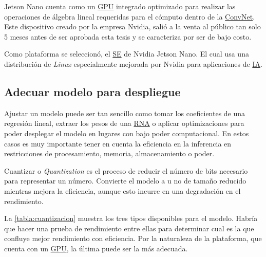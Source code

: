 Jetson Nano cuenta como un \hyperlink{abbr}{GPU} integrado optimizado para
    realizar las operaciones de álgebra lineal requeridas para el cómputo dentro
    de la \hyperlink{abbr}{ConvNet}. Este dispositivo creado por la empresa
    Nvidia, salió a la venta al público tan solo 5 meses antes de ser aprobada
    esta tesis y se caracteriza por ser de bajo costo.~\cite{Long2019}

Como plataforma se seleccionó, el \hyperlink{abbr}{SE} de Nvidia Jetson Nano. El
cual usa una distribución de \emph{Linux} especialmente mejorada por Nvidia para
aplicaciones de \hyperlink{abbr}{IA}. 

\subsection{Adecuar modelo para despliegue}
Ajustar un modelo puede ser tan sencillo como tomar los coeficientes de una
regresión lineal, extraer los pesos de una \hyperlink{abbr}{RNA} o aplicar
optimizaciones para poder desplegar el modelo en lugares con bajo poder
computacional. En estos casos es muy importante tener en cuenta la eficiencia en
la inferencia en restricciones de procesamiento, memoria, almacenamiento o
poder.

Cuantizar o \emph{Quantization} es el proceso de reducir el número de bits
necesario para representar un número. Convierte el modelo a u no
de tamaño reducido mientras mejora la eficiencia, aunque esto incurre
en una degradación en el rendimiento. 

La \autoref{tabla:cuantizacion} muestra los tres tipos disponibles para el
modelo. Habría que hacer una prueba de rendimiento entre ellas para determinar
cual es la que confluye mejor rendimiento con eficiencia. Por la naturaleza de
la plataforma, que cuenta con un \hyperlink{abbr}{GPU}, la última puede ser la
más adecuada.

\begin{table}[H]
    \centering
    \caption{Tipos de cuantización para modelos de Deep Learning}
    \label{tabla:cuantizacion}
    \end{table}

